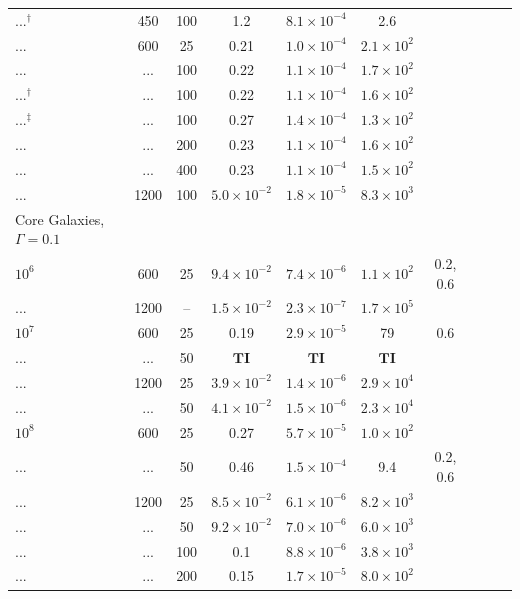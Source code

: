 \documentclass[usenatbib,fleqn]{mn2e}
\begin{document}
\begin{table}
\begin{threeparttable}
\begin{minipage}{18cm}
\begin{tabular}{lccccccccc}
...$^{\dagger}$ & 450 & 100 & 1.2 & $ 8.1 \times 10^{ -4 }$ & 2.6 \\
... & 600 & 25 & 0.21 & $ 1.0 \times 10^{ -4 }$ & $ 2.1 \times 10^{ 2 }$ \\
... & ... & 100 & 0.22 & $ 1.1 \times 10^{ -4 }$ & $ 1.7 \times 10^{ 2
}$ \\
...$^{\dagger}$ & ... & 100 & 0.22 & $ 1.1 \times 10^{ -4 }$ & $ 1.6 \times 10^{ 2 }$ \\
...$^{\ddagger}$  & ... & 100 & 0.27 & $ 1.4 \times 10^{ -4 }$ & $ 1.3 \times 10^{ 2
}$ \\
... & ... & 200 & 0.23 & $ 1.1 \times 10^{ -4 }$ & $ 1.6 \times 10^{ 2 }$ \\
... & ... & 400 & 0.23 & $ 1.1 \times 10^{ -4 }$ & $ 1.5 \times 10^{ 2 }$ \\
... & 1200 & 100 & $ 5.0 \times 10^{ -2 }$ & $ 1.8 \times 10^{ -5 }$ & $ 8.3 \times 10^{ 3 }$ \\
\hline
Core Galaxies, $\Gamma = 0.1$  &  & & & & & & & & \\
$    10^{ 6 }$ & 600 & 25 & $ 9.4 \times 10^{ -2 }$ & $ 7.4 \times
10^{ -6 }$ & $ 1.1 \times 10^{ 2 }$ & 0.2, 0.6\\
... & 1200 & -- & $ 1.5 \times 10^{ -2 }$ & $ 2.3 \times 10^{ -7 }$ & $ 1.7 \times 10^{ 5 }$ \\
$    10^{ 7 }$ & 600 & 25 & 0.19 & $ 2.9 \times 10^{ -5 }$ & 79 & 0.6 \\
... & ... & 50 & $\mathbf{TI}$ & $\mathbf{TI}$ & $\mathbf{TI}$ \\
... & 1200 & 25 & $ 3.9 \times 10^{ -2 }$ & $ 1.4 \times 10^{ -6 }$ & $ 2.9 \times 10^{ 4 }$ \\
 ... & ... & 50 & $ 4.1 \times 10^{ -2 }$ & $ 1.5 \times 10^{ -6 }$ & $ 2.3 \times 10^{ 4 }$ \\
$    10^{ 8 }$ & 600 & 25 & 0.27 & $ 5.7 \times 10^{ -5 }$ &
 $ 1.0 \times 10^{ 2 }$ \\
... & ... & 50 & 0.46 & $ 1.5 \times 10^{ -4 }$ & 9.4 & 0.2, 0.6\\
... & 1200 & 25 & $ 8.5 \times 10^{ -2 }$ & $ 6.1 \times 10^{ -6 }$ & $ 8.2 \times 10^{ 3 }$ \\
... & ... & 50 & $ 9.2 \times 10^{ -2 }$ & $ 7.0 \times 10^{ -6 }$ & $ 6.0 \times 10^{ 3 }$ \\
... & ... & 100 & 0.1 & $ 8.8 \times 10^{ -6 }$ & $ 3.8 \times 10^{ 3 }$ \\
... & ... & 200 & 0.15 & $ 1.7 \times 10^{ -5 }$ & $ 8.0 \times 10^{ 2 }$ \\
\hline

\end{tabular}
\end{minipage}
\end{threeparttable}
\end{table}
\end{document}

